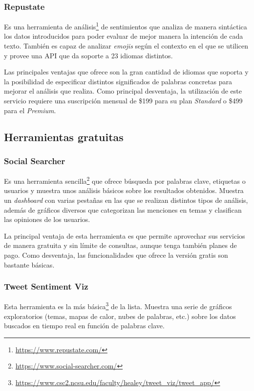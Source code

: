 \subsubsection{Repustate}

Es una herramienta de análisis\footnote{\url{https://www.repustate.com/}} de sentimientos que analiza de manera sintáctica los datos introducidos para poder evaluar de mejor manera la intención de cada texto. También es capaz de analizar \textit{emojis} según el contexto en el que se utilicen y provee una API que da soporte a 23 idiomas distintos.

Las principales ventajas que ofrece son la gran cantidad de idiomas que soporta y la posibilidad de especificar distintos significados de palabras concretas para mejorar el análisis que realiza. Como principal desventaja, la utilización de este servicio requiere una suscripción mensual de \$199 para su plan \textit{Standard} o \$499 para el \textit{Premium}.

\subsection{Herramientas gratuitas}

\subsubsection{Social Searcher}

Es una herramienta sencilla\footnote{\url{https://www.social-searcher.com/}} que ofrece búsqueda por palabras clave, etiquetas o usuarios y muestra unos análisis básicos sobre los resultados obtenidos. Muestra un \textit{dashboard} con varias pestañas en las que se realizan distintos tipos de análisis, además de gráficos diversos que categorizan las menciones en temas y clasifican las opiniones de los usuarios.

La principal ventaja de esta herramienta es que permite aprovechar sus servicios de manera gratuita y sin límite de consultas, aunque tenga también planes de pago. Como desventaja, las funcionalidades que ofrece la versión gratis son bastante básicas. 

\subsubsection{Tweet Sentiment Viz}

Esta herramienta es la más básica\footnote{\url{https://www.csc2.ncsu.edu/faculty/healey/tweet_viz/tweet_app/}} de la lista. Muestra una serie de gráficos exploratorios (temas, mapas de calor, nubes de palabras, etc.) sobre los datos buscados en tiempo real en función de palabras clave.

